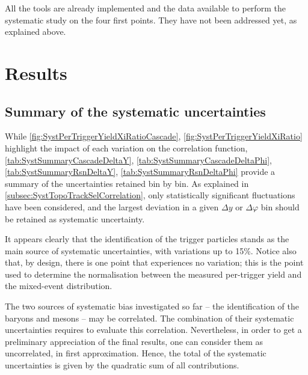 All the tools are already implemented and the data available to perform the systematic study on the four first points. They have not been addressed yet, as explained above. 


\section{Results}
\label{sec:ResultsCorrelation}

\subsection{Summary of the systematic uncertainties}

While \figs\ref{fig:SystPerTriggerYieldXiRatioCascade}, \ref{fig:SystPerTriggerYieldXiRatio} highlight the impact of each variation on the correlation function, \tabs\ref{tab:SystSummaryCascadeDeltaY}, \ref{tab:SystSummaryCascadeDeltaPhi}, \ref{tab:SystSummaryRsnDeltaY}, \ref{tab:SystSummaryRsnDeltaPhi} provide a summary of the uncertainties retained bin by bin. As explained in \Sec\ref{subsec:SystTopoTrackSelCorrelation}, only statistically significant fluctuations have been considered, and the largest deviation in a given $\Delta y$ or $\Delta \varphi$ bin should be retained as systematic uncertainty.

It appears clearly that the identification of the trigger particles stands as the main source of systematic uncertainties, with variations up to 15\%. Notice also that, by design, there is one point that experiences no variation; this is the point used to determine the normalisation between the measured per-trigger yield and the mixed-event distribution.

The two sources of systematic bias investigated so far -- the identification of the \rmXiPM baryons and \rmPhiMes mesons -- may be correlated. The combination of their systematic uncertainties requires to evaluate this correlation. Nevertheless, in order to get a preliminary appreciation of the final results, one can consider them as uncorrelated, in first approximation. Hence, the total of the systematic uncertainties is given by the quadratic sum of all contributions.


